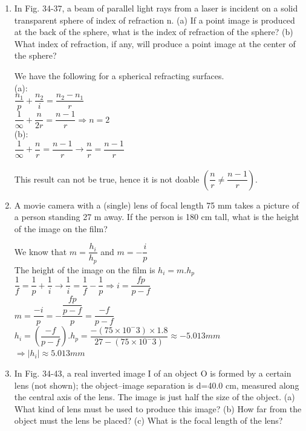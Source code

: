 \documentclass[fleqn]{article}
\begin{document}
\begin{enumerate}
    \item In Fig. 34-37, a beam of parallel light rays from a laser is incident on a solid transparent sphere of index of refraction n. (a) If a point image is produced at the back of the sphere, what is the index of refraction of the sphere? (b) What index of refraction, if any, will produce a point image at the center of the sphere?

    \textcolor{hwColor}{
      We have the following for a spherical refracting surfaces.\\
      (a): \\
      $\dfrac{n_1}{p}+\dfrac{n_2}{i}=\dfrac{n_2-n_1}{r}$ \\
      $\dfrac{1}{\infty}+\dfrac{n}{2r}=\dfrac{n-1}{r} \Longrightarrow n=2$ \\
      \bigbreak
      (b): \\
      $\dfrac{1}{\infty}+\dfrac{n}{r}=\dfrac{n-1}{r} \rightarrow \dfrac{n}{r}=\dfrac{n-1}{r}$ \\
      \\
      This result can not be true, hence it is not doable $(\dfrac{n}{r} \neq \dfrac{n-1}{r})$.
    }
    
    \item A movie camera with a (single) lens of focal length 75 mm takes a picture of a person standing 27 m away. If the person is 180 cm tall, what is the height of the image on the film?

    \textcolor{hwColor}{
      We know that $m=\dfrac{h_i}{h_p}$ and $m=-\dfrac{i}{p}$ \\
      The height of the image on the film is $h_i=m.h_p$ \\
      $\dfrac{1}{f}=\dfrac{1}{p}+\dfrac{1}{i} \rightarrow \dfrac{1}{i}=\dfrac{1}{f}-\dfrac{1}{p} \Longrightarrow i=\dfrac{fp}{p-f}$ \\
      $m=\dfrac{-i}{p}=-\dfrac{\dfrac{fp}{p-f}}{p}=\dfrac{-f}{p-f}$ \\
      $h_i=(\dfrac{-f}{p-f}).h_p=\dfrac{-(75\times10^-3)\times 1.8}{27-(75\times10^-3)}\approx -5.013 mm$ \\
      \bigbreak
      $\Longrightarrow |h_i|\approx 5.013 mm$
    }

    \item In Fig. 34-43, a real inverted image I of an object O is formed by a certain lens (not shown); the object–image separation is d=40.0 cm, measured along the central axis of the lens. The image is just half the size of the object. (a) What kind of lens must be used to produce this image? (b) How far from the object must the lens be placed? (c) What is the focal length of the lens?
    

\end{enumerate}
\end{document}
